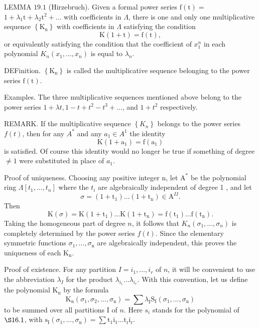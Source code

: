 \documentclass[10pt]{article}
\begin{document}
LEMMA $19.1$ (Hirzebruch). Given a formal power series $\mathrm{f}(\mathrm{t})=$ $1+\lambda_{1} \mathrm{t}+\lambda_{2} \mathrm{t}^{2}+\ldots$ with coefficients in $\Lambda$, there is one and only one multiplicative sequence $\left\{\mathrm{K}_{\mathrm{n}}\right\}$ with coefficients in $\Lambda$ satisfying the condition
$$
\mathrm{K}(1+\mathrm{t})=\mathrm{f}(\mathrm{t}),
$$
or equivalently satisfying the condition that the coefficient of $x_{1}^{n}$ in each polynomial $K_{n}\left(x_{1}, \ldots, x_{n}\right)$ is equal to $\lambda_{n}$.

DEFinition. $\left\{\mathrm{K}_{\mathrm{n}}\right\}$ is called the multiplicative sequence belonging to the power series $\mathrm{f}(\mathrm{t})$.

Examples. The three multiplicative sequences mentioned above belong to the power series $1+\lambda t, 1-t+t^{2}-t^{3}+\ldots$, and $1+t^{2}$ respectively.

REMARK. If the multiplicative sequence $\left\{K_{n}\right\}$ belongs to the power series $f(t)$, then for any $A^{*}$ and any $a_{1} \in A^{1}$ the identity
$$
\mathrm{K}\left(1+\mathrm{a}_{1}\right)=\mathrm{f}\left(\mathrm{a}_{1}\right)
$$
is satisfied. Of course this identity would no longer be true if something of degree $\neq 1$ were substituted in place of $a_{1}$.

Proof of uniqueness. Choosing any positive integer $\mathrm{n}$, let $\mathrm{A}^{*}$ be the polynomial ring $\Lambda\left[t_{1}, \ldots, t_{n}\right]$ where the $t_{i}$ are algebraically independent of degree 1 , and let
$$
\sigma=\left(1+\mathrm{t}_{1}\right) \ldots\left(1+\mathrm{t}_{\mathrm{n}}\right) \in \mathrm{A}^{I I} .
$$
Then
$$
\mathrm{K}(\sigma)=\mathrm{K}\left(1+\mathrm{t}_{1}\right) \ldots \mathrm{K}\left(1+\mathrm{t}_{\mathrm{n}}\right)=\mathrm{f}\left(\mathrm{t}_{1}\right) \ldots \mathrm{f}\left(\mathrm{t}_{\mathrm{n}}\right) .
$$
Taking the homogeneous part of degree $n$, it follows that $K_{n}\left(\sigma_{1}, \ldots, \sigma_{n}\right)$ is completely determined by the power series $f(t)$. Since the elementary symmetric functions $\sigma_{1}, \ldots, \sigma_{\mathrm{n}}$ are algebraically independent, this proves the uniqueness of each $\mathrm{K}_{\mathrm{n}}$.

Proof of existence. For any partition $I=i_{1}, \ldots, i_{r}$ of $n$, it will be convenient to use the abbreviation $\lambda_{I}$ for the product $\lambda_{i_{1}} \ldots \lambda_{i_{r}}$. With this convention, let us define the polynomial $\mathrm{K}_{\mathrm{n}}$ by the formula
$$
\mathrm{K}_{\mathrm{n}}\left(\sigma_{1}, \sigma_{2}, \ldots, \sigma_{\mathrm{n}}\right)=\sum \lambda_{\mathrm{I}} \mathrm{S}_{\mathrm{I}}\left(\sigma_{1}, \ldots, \sigma_{\mathrm{n}}\right)
$$
to be summed over all partitions I of $n$. Here $s_{i}$ stands for the polynomial of $\S 16.1$, with $\mathrm{s}_{\mathrm{I}}\left(\sigma_{1}, \ldots, \sigma_{\mathrm{n}}\right)=\sum \mathrm{t}_{1} \mathrm{i}_{1} \ldots \mathrm{t}_{\mathrm{r}} \mathrm{i}_{\mathrm{r}}$.
\end{document}
